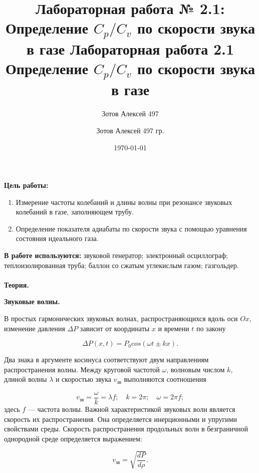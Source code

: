 \documentclass[10pt]{article}
\title{Лабораторная работа № 2.1:
    Определение $C_p/C_v$ по скорости звука в газе    
}
\date{\today}
\author{Зотов Алексей 497}
\begin{document}
        \author {Зотов Алексей 497 гр.}
    \title {Лабораторная работа 2.1 \\  Определение $C_{p}/C_{v}$ по скорости звука в газе}
    \maketitle{}   

    \indent
    \textbf{Цель работы:}
         \begin{enumerate}
         \item Измерение частоты колебаний и длины волны при резонансе звуковых колебаний в газе, заполняющем трубу. 
         \item Определение показателя адиабаты по скорости звука с помощью уравнения состояния идеального газа.
         \end{enumerate}
    \indent
        
        \textbf{В работе используются:} звуковой генератор; электронный осциллограф; теплоизолированная труба; баллон со сжатым углекислым газом; газгольдер. \\ \\


    \textbf{Теория.}

    \textbf{Звуковые волны.} 

    В простых гармонических звуковых волнах, распространяющихся вдоль оси $Ox$, изменение давления $\Delta P$ зависит от координаты $x$ и времени $t$ по закону

    \begin{equation}
        \Delta P(x,t) = P_0 cos(\omega t \pm kx).
    \end{equation}

    Два знака в аргументе косинуса соответствуют двум направлениям распространения волны. Между круговой частотой $\omega$, волновым числом $k$, длиной волны $\lambda$ и скоростью звука $v_\text{зв}$ выполняются соотношения

    \begin{equation}
        v_\text{зв} = \frac{\omega}{k} = \lambda f; \quad k = 2\pi; \quad \omega = 2\pi f;
    \end{equation}
    здесь $f$ — частота волны.
    Важной характеристикой звуковых волн является скорость их
    распространения. Она определяется инерционными и упругими свойствами среды. Скорость распространения продольных волн в безграничной однородной среде определяется выражением:
     
    \begin{equation}
        v_\text{зв} = \sqrt{\frac{dP}{d\rho}}.
    \end{equation}
\end{document}
